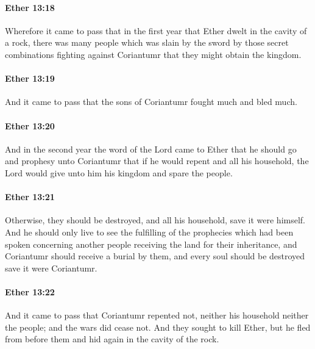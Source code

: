 		\paragraph{Ether 13:18} %
			\label{ETHER-13-18}

			Wherefore it came to pass that
			in the first year that Ether dwelt in the cavity of a rock,
			there was many people which was slain by the sword
			by those secret combinations fighting against Coriantumr
			that they might obtain the kingdom.

		\paragraph{Ether 13:19} %
			\label{ETHER-13-19}

			And it came to pass that the sons of Coriantumr fought much and bled much.

		\paragraph{Ether 13:20} %
			\label{ETHER-13-20}

			And in the second year the word of the Lord came to Ether
			that he should go and prophesy unto Coriantumr
			that if he would repent and all his household,
			the Lord would give unto him his kingdom and spare the people.

		\paragraph{Ether 13:21} %
			\label{ETHER-13-21}

			Otherwise, they should be destroyed,
			and all his household, save it were himself.
			And he should only live to see the fulfilling of the prophecies
			which had been spoken concerning another people
			receiving the land for their inheritance,
			and Coriantumr should receive a burial by them,
			and every soul should be destroyed save it were Coriantumr.

		\paragraph{Ether 13:22} %
			\label{ETHER-13-22}

			And it came to pass that Coriantumr repented not,
			neither his household neither the people;
			and the wars did cease not.
			And they sought to kill Ether,
			but he fled from before them and hid again in the cavity of the rock.

